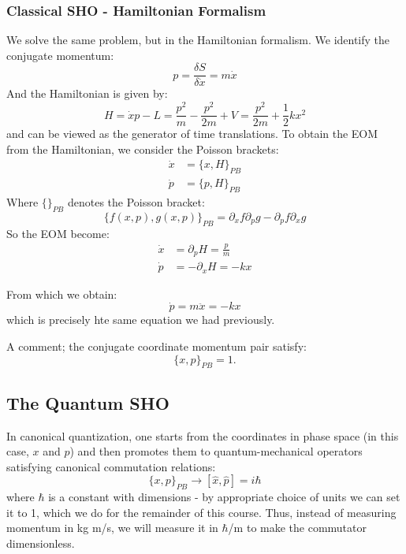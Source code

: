 \subsubsection*{Classical SHO - Hamiltonian Formalism}
We solve the same problem, but in the Hamiltonian formalism. We identify the conjugate momentum:
\begin{equation}
    p = \frac{\delta S}{\delta \dot{x}} = m\dot{x}
\end{equation}
And the Hamiltonian is given by:
\begin{equation}
    H = \dot{x}p - L = \frac{p^2}{m} - \frac{p^2}{2m} + V = \frac{p^2}{2m} + \frac{1}{2}kx^2
\end{equation}
and can be viewed as the generator of time translations. To obtain the EOM from the Hamiltonian, we consider the Poisson brackets:
\begin{subequations}
    \begin{align}
    \dot{x} &= \{x, H\}_{PB} \\
    \dot{p} &= \{p, H\}_{PB}
    \end{align}
\end{subequations}
Where $\{\}_{PB}$ denotes the Poisson bracket:
\begin{equation}
    \{f(x, p), g(x, p)\}_{PB} = \partial_x f \partial_p g - \partial_p f \partial_x g
\end{equation}
So the EOM become:
\begin{subequations}
    \begin{align}
        \dot{x} &= \partial_p H = \frac{p}{m} \\
        \dot{p} &= -\partial_x H = -kx
    \end{align}
\end{subequations}

From which we obtain:
\begin{equation}
    \dot{p} = m\ddot{x} = -kx
\end{equation}
which is precisely hte same equation we had previously.

A comment; the conjugate coordinate momentum pair satisfy:
\begin{equation}
    \{x, p\}_{PB} = 1.
\end{equation}

\subsection{The Quantum SHO}
In canonical quantization, one starts from the coordinates in phase space (in this case, $x$ and $p$) and then promotes them to quantum-mechanical operators satisfying canonical commutation relations:
\begin{equation}
    \{x, p\}_{PB} \to [\hat{x}, \hat{p}] = i\hbar
\end{equation}
where $\hbar$ is a constant with dimensions - by appropriate choice of units we can set it to 1, which we do for the remainder of this course. Thus, instead of measuring momentum in kg m/s, we will measure it in $\hbar$/m to make the commutator dimensionless.

